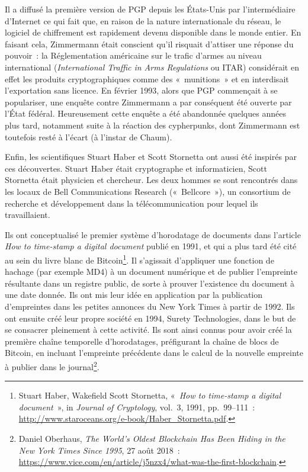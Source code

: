 \documentclass[
  a5paper,
  smalldemyvopaper,10pt,twoside,onecolumn,openright,extrafontsizes,hidelinks]{memoir}
\begin{document}
Il a diffusé la première version de PGP depuis les États-Unis par
l'intermédiaire d'Internet ce qui fait que, en raison de la nature
internationale du réseau, le logiciel de chiffrement est rapidement
devenu disponible dans le monde entier. En faisant cela, Zimmermann
était conscient qu'il risquait d'attiser une réponse du pouvoir~: la
Réglementation américaine sur le trafic d'armes au niveau international
(\emph{International Traffic in Arms Regulations} ou ITAR) considérait
en effet les produits cryptographiques comme des «~munitions~» et en
interdisait l'exportation sans licence. En février 1993, alors que PGP
commençait à se populariser, une enquête contre Zimmermann a par
conséquent été ouverte par l'État fédéral. Heureusement cette enquête a
été abandonnée quelques années plus tard, notamment suite à la réaction
des cypherpunks, dont Zimmermann est toutefois resté à l'écart (à
l'instar de Chaum).

Enfin, les scientifiques Stuart Haber et Scott Stornetta ont aussi été
inspirés par ces découvertes. Stuart Haber était cryptographe et
informaticien, Scott Stornetta était physicien et chercheur. Les deux
hommes se sont rencontrés dans les locaux de Bell Communications
Research («~Bellcore~»), un consortium de recherche et développement
dans la télécommunication pour lequel ils travaillaient.

Ils ont conceptualisé le premier système d'horodatage de documents dans
l'article \emph{How to time-stamp a digital document} publié en 1991, et
qui a plus tard été cité au sein du livre blanc de Bitcoin\footnote{Stuart
  Haber, Wakefield Scott Stornetta, «~\emph{How to time-stamp a digital
  document}~», in \emph{Journal of Cryptology}, vol.~3, 1991,
  pp.~99--111~:
  \url{http://www.staroceans.org/e-book/Haber_Stornetta.pdf}.}. Il
s'agissait d'appliquer une fonction de hachage (par exemple MD4) à un
document numérique et de publier l'empreinte résultante dans un registre
public, de sorte à prouver l'existence du document à une date donnée.
Ils ont mis leur idée en application par la publication d'empreintes
dans les petites annonces du New York Times à partir de 1992. Ils ont
ensuite créé leur propre société en 1994, Surety Technologies, dans le
but de se consacrer pleinement à cette activité. Ils sont ainsi connus
pour avoir créé la première chaîne temporelle d'horodatages, préfigurant
la chaîne de blocs de Bitcoin, en incluant l'empreinte précédente dans
le calcul de la nouvelle empreinte à publier dans le journal\footnote{Daniel
  Oberhaus, \emph{The World's Oldest Blockchain Has Been Hiding in the
  New York Times Since 1995}, 27 août 2018~:
  \url{https://www.vice.com/en/article/j5nzx4/what-was-the-first-blockchain}.}.
\end{document}
